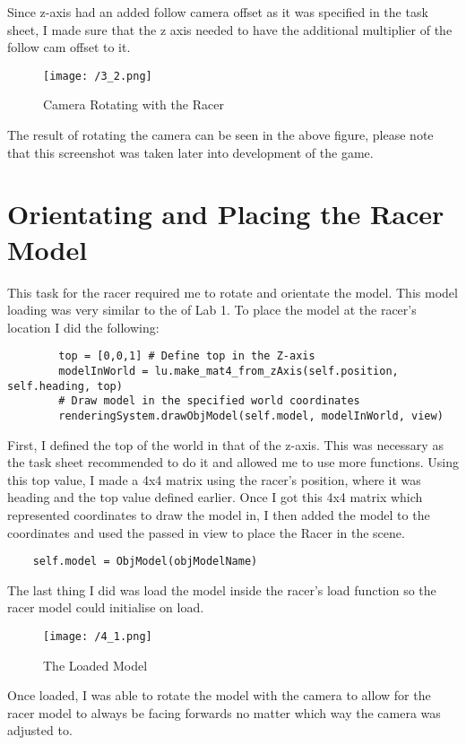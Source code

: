 \documentclass[11pt, oneside, a4paper]{article}
\begin{document}
Since z-axis had an added follow camera offset as it was specified in the task sheet, I made sure that the z axis needed to have the additional multiplier of the follow cam offset to it.

\begin{figure}[!ht]
	\centerline{\texttt{[image: /3\_2.png]}}
	\caption{Camera Rotating with the Racer}
	\label{fig:figure3}
\end{figure}
The result of rotating the camera can be seen in the above figure, please note that this screenshot was taken later into development of the game.

\section{Orientating and Placing the Racer Model}
This task for the racer required me to rotate and orientate the model. This model loading was very similar to the of Lab 1. To place the model at the racer's location I did the following:

\begin{lstlisting}  
        top = [0,0,1] # Define top in the Z-axis
        modelInWorld = lu.make_mat4_from_zAxis(self.position, self.heading, top)
        # Draw model in the specified world coordinates
        renderingSystem.drawObjModel(self.model, modelInWorld, view) 
\end{lstlisting}

First, I defined the top of the world in that of the z-axis. This was necessary as the task sheet recommended to do it and allowed me to use more functions. Using this top value, I made a 4x4 matrix using the racer's position, where it was heading and the top value defined earlier. Once I got this 4x4 matrix which represented coordinates to draw the model in, I then added the model to the coordinates and used the passed in view to place the Racer in the scene. 

\begin{lstlisting}  
	self.model = ObjModel(objModelName)
\end{lstlisting}

The last thing I did was load the model inside the racer's load function so the racer model could initialise on load. 

\begin{figure}[!ht]
	\centerline{\texttt{[image: /4\_1.png]}}
	\caption{The Loaded Model}
	\label{fig:figure4}
\end{figure}
Once loaded, I was able to rotate the model with the camera to allow for the racer model to always be facing forwards no matter which way the camera was adjusted to.
\end{document}
